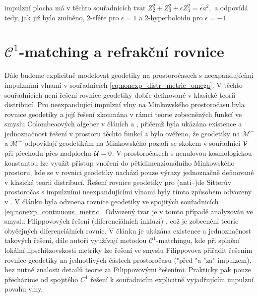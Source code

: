 impulzní plocha má v těchto souřadnicích tvar
$Z_2^2 + Z_3^2 + \epsilon Z_4^2 = \epsilon a^2,$
a odpovídá tedy, jak již bylo zmíněno, 2-sféře pro $\epsilon=1$ a 2-hyperboloidu pro $\epsilon=-1$.

\section{$\mathcal{C}^1$-matching a refrakční rovnice}
Dále budeme explicitně modelovat geodetiky na prostoročasech s neexpandujícími impulzními vlnami v souřadnicích
\eqref{eq:nonexp_distr_metric_omega}. V těchto souřadnicích není řešení rovnice geodetiky dobře definované v
klasické teorii distribucí. Pro neexpandující impulzní vlny na Minkowského prostoročasu byla rovnice geodetiky
a její řešení zkoumána v rámci teorie zobecněných funkcí ve smyslu Colombeaových algeber v článích \cite{Steinbauer_1998} a \cite{Kunzinger_1999},
přičemž byla ukázána existence a jednoznačnost řešení v prostoru těchto funkcí a bylo ověřeno, že geodetiky na $\mathcal{M}^-$ a $\mathcal{M}^+$ odpovídají
geodetikám na Minkowského pozadí se skokem v souřadnici $\mathcal{V}$ při přechodu přes nadplochu $\mathcal{U}=0$. V prostoročasech s
nenulovou kosmologickou konstantou lze využít přístup vnoření do pětidimenzionálního Minkowského prostoru, kde se v rovnici
geodetiky nachází pouze výrazy jednoznačně definované v klasické teorii distribucí. Řešení rovnice geodetiky
pro (anti--)de Sitterův prostoročas s impulzními neexpandujícími vlnami byly tímto způsobem odvozeny v \cite{Podolsk__2001}.
V článku \cite{Podolsky:2014ysa} byla odvoena rovnice geodetiky ve spojitých souřadnicích \eqref{eq:nonexp_continuous_metric}.
Odvozený tvar je v tomto případě analyzován ve smyslu Filippovových řešení (diferenciálních inkluzí) \cite{filippov1988differential}, což je zobecnění teorie obyčejných diferenciálních rovnic.
V článku je ukázána existence a jednoznačnost takových řešení, dále autoři využívají metodou $\mathcal{C}^1$-matchingu,
kde při splnění lokální lipschitzovskosti metriky lze řešení ve smyslu Filippovova přiřadit řešením rovnice geodetiky na jednotlivých částech prostoročasu
("před "a "za" impulzem), bez nutné znalosti detailů teorie za Filippovovými řešeními. Prakticky pak pouze přecházíme od
spojitého $C^1$ řešení k souřadnicím explicitně vyjadřujícím impulzní povahu vlny.


